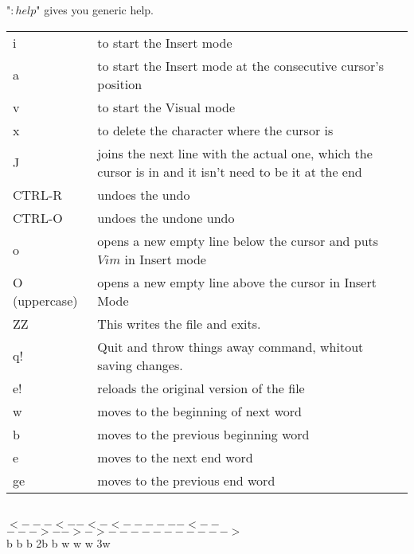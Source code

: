 \documentclass[11p]{book}
\begin{document}
"$:help$" gives you generic help. \\

\begin{tabular}{p{2.8cm} p{13cm}}
i & to start the Insert mode \\
a & to start the Insert mode at the consecutive cursor's position\\
v & to start the Visual mode \\
x & to delete the character where the cursor is \\
J & joins the next line with the actual one, which the cursor is in and it isn't need to be it at the end \\
CTRL-R & undoes the undo \\
CTRL-O & undoes the undone undo \\
o & opens a new empty line below the cursor and puts $Vim$ in Insert mode \\
O (uppercase) & opens a new empty line above the cursor in Insert Mode \\
ZZ & This writes the file and exits. \\
q! & Quit and throw things away command, whitout saving changes. \\
e! & reloads the original version of the file \\
\hline
w & moves to the beginning of next word \\
b & moves to the previous beginning word \\
e & moves to the next end word \\
ge & moves to the previous end word \\
\end{tabular} \\

$<---<--<-<------<--$ \hspace*{1cm} $--->-->->----------->$ \\
\hspace*{1.5cm} b \hspace{0.78cm}b \hspace*{0.5cm} b \hspace*{1cm} 2b \hspace*{1.2cm} b \hspace*{1.5cm} w \hspace*{0.8cm} w \hspace*{0.4cm} w \hspace*{1.5cm} 3w \\
\end{document}
